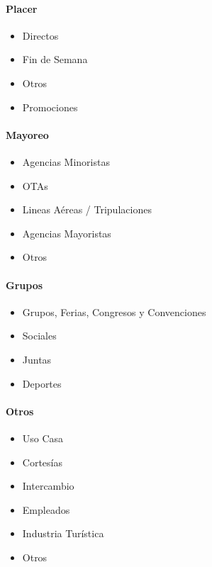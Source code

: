 \documentclass[a4paper,11pt]{article}
\begin{document}
\paragraph{\textbf{Placer}}
\begin{itemize}[noitemsep]
\item Directos
\item Fin de Semana
\item Otros
\item Promociones
\end{itemize}
\paragraph{\textbf{Mayoreo}}
\begin{itemize}[noitemsep]
\item Agencias Minoristas
\item OTAs
\item Lineas Aéreas / Tripulaciones
\item Agencias Mayoristas
\item Otros
\end{itemize}
\paragraph{\textbf{Grupos}}
\begin{itemize}[noitemsep]
\item Grupos, Ferias, Congresos y Convenciones
\item Sociales
\item Juntas
\item Deportes
\end{itemize}
\paragraph{\textbf{Otros}}
\begin{itemize}[noitemsep]
\item Uso Casa
\item Cortesías
\item Intercambio
\item Empleados
\item Industria Turística
\item Otros
\end{itemize}
\end{document}
